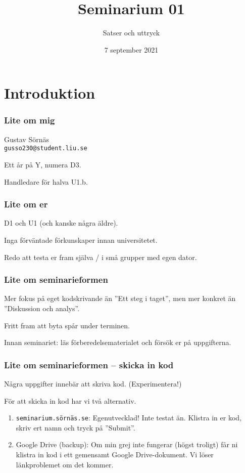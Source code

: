 \documentclass{beamer}
\title{Seminarium 01}
\subtitle{Satser och uttryck}
\date{7 september 2021}
\begin{document}
  \frame{\titlepage}

  \section*{Introduktion}

  \begin{frame}
    \frametitle{Lite om mig}

    Gustav Sörnäs \\
    \texttt{gusso230@student.liu.se}

    Ett år på Y, numera D3.

    Handledare för halva U1.b.

  \end{frame}

  \begin{frame}
    \frametitle{Lite om er}

    D1 och U1 (och kanske några äldre).

    Inga förväntade förkunskaper innan universitetet.

    Redo att testa er fram själva / i små grupper med egen dator.

  \end{frame}

  \begin{frame}
    \frametitle{Lite om seminarieformen}

    Mer fokus på eget kodskrivande än ''Ett steg i taget'', men mer konkret än
    ''Diskussion och analys''.

    Fritt fram att byta spår under terminen.

    Innan seminariet: läs förberedelsematerialet och försök er på uppgifterna.

  \end{frame}

  \begin{frame}
    \frametitle{Lite om seminarieformen -- skicka in kod}

    Några uppgifter innebär att skriva kod. (Experimentera!)

    För att skicka in kod har vi två alternativ.

    \begin{enumerate}

      \item \texttt{seminarium.sörnäs.se}: Egenutvecklad! Inte testat än. Klistra
      in er kod, skriv ert namn och tryck på ''Submit''.

      \item Google Drive (backup): Om min grej inte fungerar (högst troligt) får
      ni klistra in kod i ett gemensamt Google Drive-dokument. Vi löser
      länkproblemet om det kommer.

    \end{enumerate}

  \end{frame}
\end{document}
